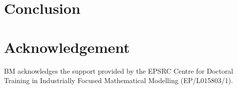 \documentclass[10pt,twocolumn,a4paper]{article}
\begin{document}
\section{Conclusion}
\label{sec:conclusion}


\section{Acknowledgement}
BM acknowledges the support provided by the EPSRC Centre for Doctoral Training in Industrially Focused Mathematical Modelling (EP/L015803/1).


\end{document}
